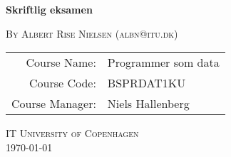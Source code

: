 \begin{titlepage}
  \vspace*{\fill}

  \begin{center}
    \hbox{\makebox[1\textwidth][c]{\bigguslinus}}
    {\Huge\textbf{Skriftlig eksamen} \par}
    \hbox{\makebox[1\textwidth][c]{\bigguslinus}}
    \vspace{1cm}

    \textsc{By Albert Rise Nielsen (albn@itu.dk)}\\[0.5cm]
    \begin{tabular}{rl}
        \midrule
          Course Name:& Programmer som data\\
          Course Code:& BSPRDAT1KU\\
          Course Manager:& Niels Hallenberg\\
        \bottomrule
    \end{tabular}
    
    \vspace{0.5cm}
    \textsc{IT University of Copenhagen}\\[0.5cm]
    \today
  \end{center}

  \vspace*{\fill}
\end{titlepage}